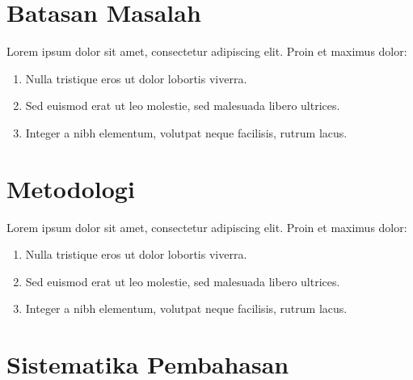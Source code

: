 \section{Batasan Masalah}

Lorem ipsum dolor sit amet, consectetur adipiscing elit. Proin et maximus dolor: 
\begin{enumerate}
    \item Nulla tristique eros ut dolor lobortis viverra.
    \item Sed euismod erat ut leo molestie, sed malesuada libero ultrices.
    \item Integer a nibh elementum, volutpat neque facilisis, rutrum lacus.
\end{enumerate}

\section{Metodologi}

Lorem ipsum dolor sit amet, consectetur adipiscing elit. Proin et maximus dolor: 
\begin{enumerate}
    \item Nulla tristique eros ut dolor lobortis viverra.
    \item Sed euismod erat ut leo molestie, sed malesuada libero ultrices.
    \item Integer a nibh elementum, volutpat neque facilisis, rutrum lacus.
\end{enumerate}

\section{Sistematika Pembahasan}

